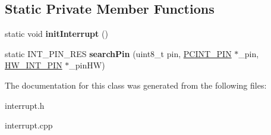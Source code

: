 \subsection*{Static Private Member Functions}
\begin{DoxyCompactItemize}
\item 
\mbox{\label{classInterrupt_acf51bc7c69619e4ccd95e90ff31aa286}} 
static void {\bfseries init\+Interrupt} ()
\item 
\mbox{\label{classInterrupt_a262ad3f1bb4a5cdf24a356b20d037a56}} 
static I\+N\+T\+\_\+\+P\+I\+N\+\_\+\+R\+ES {\bfseries search\+Pin} (uint8\+\_\+t pin, \hyperlink{structPCINT__PIN}{P\+C\+I\+N\+T\+\_\+\+P\+IN} $\ast$\+\_\+pin, \hyperlink{structHW__INT__PIN}{H\+W\+\_\+\+I\+N\+T\+\_\+\+P\+IN} $\ast$\+\_\+pin\+HW)
\end{DoxyCompactItemize}


The documentation for this class was generated from the following files\+:\begin{DoxyCompactItemize}
\item 
interrupt.\+h\item 
interrupt.\+cpp\end{DoxyCompactItemize}
